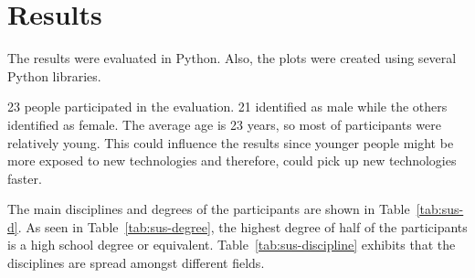 \section{Results}\label{section:eval-results}


\newcommand{\participantsCount}{23}
\newcommand{\participantsMale}{21}
\newcommand{\participantsAge}{23}

\newcommand{\evalExpMvAvgPoses}{2.83}
\newcommand{\evalExpMvStdPoses}{1.94}
\newcommand{\evalExpMvParticipants}{\participantsCount}

\newcommand{\kammAvgHits}{36.23/60}
\newcommand{\kammAvgStd}{6.87/60}
\newcommand{\youngAvgHits}{0.85}
\newcommand{\youngAvgStd}{-}
\newcommand{\oursAvgHits}{26.13/30}
\newcommand{\oursAvgStd}{5.52/30}

\newcommand{\evalExpMvSusScore}{83.04}
\newcommand{\evalExpMvSusGrade}{B}
\newcommand{\evalExpMvSusAdj}{\enquote{Good}}

\newcommand{\evalExpLpSusScore}{91.41}
\newcommand{\evalExpLpSusGrade}{A}
\newcommand{\evalExpLpSusAdj}{\enquote{Excellent}}

\newcommand{\evalExpVkSusScore}{71.63}
\newcommand{\evalExpVkSusGrade}{C}
\newcommand{\evalExpVkSusAdj}{\enquote{Ok}}

\newcommand{\participantsFemale}{\pgfmathparse{\participantsCount - \participantsMale}\pgfmathprintnumber[fixed, precision=2]{\pgfmathresult}}%

The results were evaluated in Python. Also, the plots were created using several Python libraries.

\participantsCount{} people participated in the evaluation. \participantsMale{} identified as male while the others identified as female. The average age is \participantsAge{} years, so most of participants were relatively young. This could influence the results since younger people might be more exposed to new technologies and therefore, could pick up new technologies faster.

The main disciplines and degrees of the participants are shown in Table~\ref{tab:sus-d}. As seen in Table~\ref{tab:sus-degree}, the highest degree of half of the participants is a high school degree or equivalent.
Table~\ref{tab:sus-discipline} exhibits that the disciplines are spread amongst different fields.

